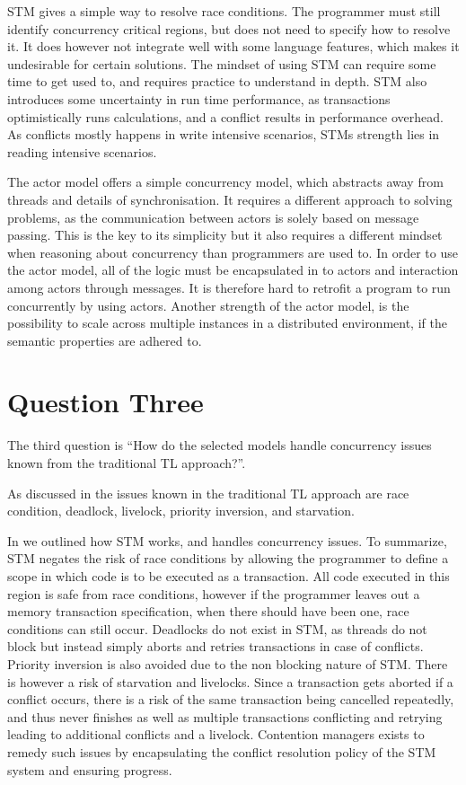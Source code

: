 \ac{STM} gives a simple way to resolve race conditions. The programmer must still identify concurrency critical regions, but does not need to specify how to resolve it. It does however not integrate well with some language features, which makes it undesirable for certain solutions. The mindset of using \ac{STM} can require some time to get used to, and requires practice to understand in depth. \ac{STM} also introduces some uncertainty in run time performance, as transactions optimistically runs calculations, and a conflict results in performance overhead. As conflicts mostly happens in write intensive scenarios, \acp{STM} strength lies in reading intensive scenarios.

The actor model offers a simple concurrency model, which abstracts away from threads and details of synchronisation. It requires a different approach to solving problems, as the communication between actors is solely based on message passing. This is the key to its simplicity but it also requires a different mindset when reasoning about concurrency than programmers are used to. In order to use the actor model, all of the logic must be encapsulated in to actors and interaction among actors through messages. It is therefore hard to retrofit a program to run concurrently by using actors. Another strength of the actor model, is the possibility to scale across multiple instances in a distributed environment, if the semantic properties are adhered to.


\section{Question Three}
The third question is ``How do the selected models handle concurrency issues known from the traditional \ac{TL} approach?''. 

As discussed in  the issues known in the traditional \ac{TL} approach are race condition, deadlock, livelock, priority inversion, and starvation. 

In  we outlined how \ac{STM} works, and handles concurrency issues. To summarize, \ac{STM} negates the risk of race conditions by allowing the programmer to define a scope in which code is to be executed as a transaction. All code executed in this region is safe from race conditions, however if the programmer leaves out a memory transaction specification, when there should have been one, race conditions can still occur. Deadlocks do not exist in \ac{STM}, as threads do not block but instead simply aborts and retries transactions in case of conflicts. Priority inversion is also avoided due to the non blocking nature of \ac{STM}.  There is however a risk of starvation and livelocks. Since a transaction gets aborted if a conflict occurs, there is a risk of the same transaction being cancelled repeatedly, and thus never finishes as well as multiple transactions conflicting and retrying leading to additional conflicts and a livelock. Contention managers  exists to remedy such issues by encapsulating the conflict resolution policy of the \ac{STM} system and ensuring progress.


